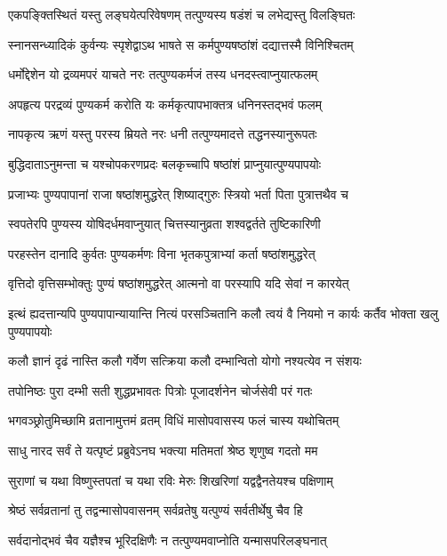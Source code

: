 \twolineshloka
{एकपङ्क्तिस्थितं यस्तु लङ्घयेत्परिवेषणम्}
{तत्पुण्यस्य षडंशं च लभेद्यस्तु विलङ्घितः} %

\twolineshloka
{स्नानसन्ध्यादिकं कुर्वन्यः स्पृशेद्वाऽथ भाषते}
{स कर्मपुण्यषष्ठांशं दद्यात्तस्मै विनिश्चितम्} %

\twolineshloka
{धर्मोद्देशेन यो द्रव्यमपरं याचते नरः}
{तत्पुण्यकर्मजं तस्य धनदस्त्वाप्नुयात्फलम्} %

\twolineshloka
{अपहृत्य परद्रव्यं पुण्यकर्म करोति यः}
{कर्मकृत्पापभाक्तत्र धनिनस्तद्भवं फलम्} %

\twolineshloka
{नापकृत्य ऋणं यस्तु परस्य म्रियते नरः}
{धनी तत्पुण्यमादत्ते तद्धनस्यानुरूपतः} %

\twolineshloka
{बुद्धिदाताऽनुमन्ता च यश्चोपकरणप्रदः}
{बलकृच्चापि षष्ठांशं प्राप्नुयात्पुण्यपापयोः} %

\twolineshloka
{प्रजाभ्यः पुण्यपापानां राजा षष्ठांशमुद्धरेत्}
{शिष्याद्गुरुः स्त्रियो भर्ता पिता पुत्रात्तथैव च} %

\twolineshloka
{स्वपतेरपि पुण्यस्य योषिदर्धमवाप्नुयात्}
{चित्तस्यानुव्रता शश्वद्वर्तते तुष्टिकारिणी} %

\twolineshloka
{परहस्तेन दानादि कुर्वतः पुण्यकर्मणः}
{विना भृतकपुत्राभ्यां कर्ता षष्ठांशमुद्धरेत्} %

\twolineshloka
{वृत्तिदो वृत्तिसम्भोक्तुः पुण्यं षष्ठांशमुद्धरेत्}
{आत्मनो वा परस्यापि यदि सेवां न कारयेत्} %

\twolineshloka
{इत्थं ह्यदत्तान्यपि पुण्यपापान्यायान्ति नित्यं परसञ्चितानि}
{कलौ त्वयं वै नियमो न कार्यः कर्तैव भोक्ता खलु पुण्यपापयोः} %

\twolineshloka
{कलौ ज्ञानं दृढं नास्ति कलौ गर्वेण सत्क्रिया}
{कलौ दम्भान्वितो योगो नश्यत्येव न संशयः} %

\twolineshloka
{तपोनिष्ठः पुरा दम्भी सती शुद्धप्रभावतः}
{पित्रोः पूजादर्शनेन चोर्जसेवी परं गतः} %


\twolineshloka
{भगवञ्छ्रोतुमिच्छामि व्रतानामुत्तमं व्रतम्}
{विधिं मासोपवासस्य फलं चास्य यथोचितम्} %


\twolineshloka
{साधु नारद सर्वं ते यत्पृष्टं प्रब्रुवेऽनघ}
{भक्त्या मतिमतां श्रेष्ठ शृणुष्व गदतो मम} %

\twolineshloka
{सुराणां च यथा विष्णुस्तपतां च यथा रविः}
{मेरुः शिखरिणां यद्वद्वैनतेयश्च पक्षिणाम्} %

\twolineshloka
{श्रेष्ठं सर्वव्रतानां तु तद्वन्मासोपवासनम्}
{सर्वव्रतेषु यत्पुण्यं सर्वतीर्थेषु चैव हि} %

\twolineshloka
{सर्वदानोद्भवं चैव यज्ञैश्च भूरिदक्षिणैः}
{न तत्पुण्यमवाप्नोति यन्मासपरिलङ्घनात्} %

